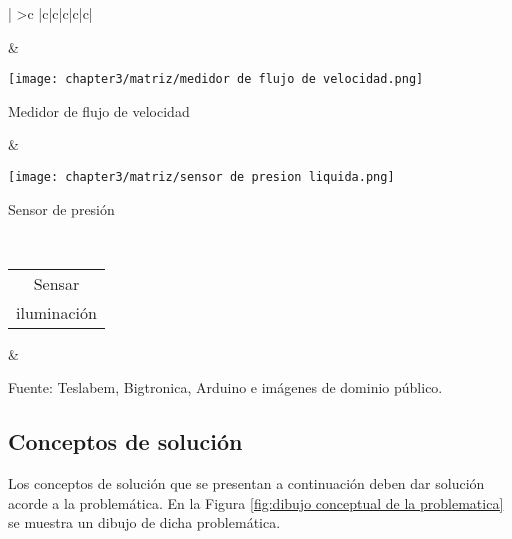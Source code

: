 \begin{landscape}
\begin{longtable}{|
			>{}c |c|c|c|c|c|}
\begin{minipage}{\mymaxsizeofcontenttable}
		\end{minipage} &
		\begin{minipage}{\mymaxsizeofcontenttable}
			\centering\texttt{[image: chapter3/matriz/medidor de flujo de velocidad.png]} \\ 
			\begin{myflushcenter}
				{\footnotesize Medidor de flujo de velocidad}
			\end{myflushcenter}
		\end{minipage} &
		\begin{minipage}{\mymaxsizeofcontenttable}
			\centering\texttt{[image: chapter3/matriz/sensor de presion liquida.png]} \\ 
			\begin{myflushcenter}
				{\footnotesize Sensor de presión}
			\end{myflushcenter}
		\end{minipage} \\ \hline
		\begin{tabular}[c]{@{}c@{}}Sensar\\ iluminación\end{tabular} &
		 \\ \hline
	\end{longtable}	
	\begin{myflushleftlandscape}
		Fuente: Teslabem, Bigtronica, Arduino e imágenes de dominio público.
	\end{myflushleftlandscape}	
\end{landscape}


\newpage
\pagestyle{myportland}

\subsection{Conceptos de solución}

Los conceptos de solución que se presentan a continuación deben dar solución acorde a la problemática. En la Figura \ref{fig:dibujo conceptual de la problematica} se muestra un dibujo de dicha problemática.

